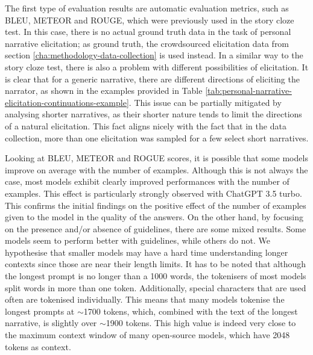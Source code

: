 % 
The first type of evaluation results are automatic evaluation metrics, such as BLEU, METEOR and ROUGE, which were previously used in the story cloze test. In this case, there is no actual ground truth data in the task of personal narrative elicitation; as ground truth, the crowdsourced elicitation data from section \ref{cha:methodology-data-collection} is used instead. In a similar way to the story cloze test, there is also a problem with different possibilities of elicitation. It is clear that for a generic narrative, there are different directions of eliciting the narrator, as shown in the examples provided in Table \ref{tab:personal-narrative-elicitation-continuations-example}. This issue can be partially mitigated by analysing shorter narratives, as their shorter nature tends to limit the directions of a natural elicitation. This fact aligns nicely with the fact that in the data collection, more than one elicitation was sampled for a few select short narratives. 





Looking at BLEU, METEOR and ROGUE scores, it is possible that some models improve on average with the number of examples. Although this is not always the case, most models exhibit clearly improved performances with the number of examples. This effect is particularly strongly observed with ChatGPT 3.5 turbo. This confirms the initial findings on the positive effect of the number of examples given to the model in the quality of the answers.
On the other hand, by focusing on the presence and/or absence of guidelines, there are some mixed results. Some models seem to perform better with guidelines, while others do not. We hypothesise that smaller models may have a hard time understanding longer contexts since those are near their length limits. It has to be noted that although the longest prompt is no longer than a 1000 words, the tokenisers of most models split words in more than one token. Additionally, special characters that are used often are tokenised individually. This means that many models tokenise the longest prompts at $\sim$1700 tokens, which, combined with the text of the longest narrative, is slightly over $\sim$1900 tokens. This high value is indeed very close to the maximum context window of many open-source models, which have 2048 tokens as context.

